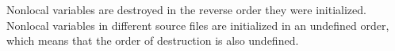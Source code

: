 
Nonlocal variables are destroyed in the reverse order they were initialized. Nonlocal variables in different source files are initialized in an undefined order, which means that the order of destruction is also undefined.



















